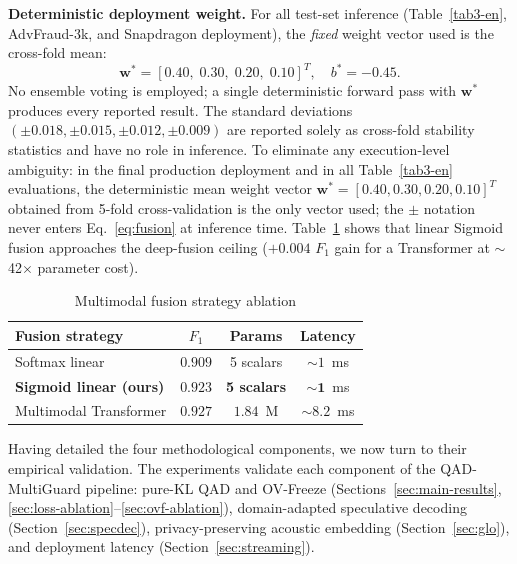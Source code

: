 \documentclass[final,5p,times,number]{elsarticle}
\begin{document}
\noindent\textbf{Deterministic deployment weight.} For all test-set inference (Table~\ref{tab3-en}, AdvFraud-3k, and Snapdragon deployment), the \emph{fixed} weight vector used is the cross-fold mean:
\begin{equation}
\label{eq:w-deploy}
\mathbf{w}^{*} = [0.40,\; 0.30,\; 0.20,\; 0.10]^{T}, \quad b^{*} = -0.45.
\end{equation}
No ensemble voting is employed; a single deterministic forward pass with $\mathbf{w}^{*}$ produces every reported result. The standard deviations $(\pm 0.018, \pm 0.015, \pm 0.012, \pm 0.009)$ are reported solely as cross-fold stability statistics and have no role in inference. To eliminate any execution-level ambiguity: in the final production deployment and in all Table~\ref{tab3-en} evaluations, the deterministic mean weight vector $\mathbf{w}^{*} = [0.40, 0.30, 0.20, 0.10]^{T}$ obtained from 5-fold cross-validation is the only vector used; the $\pm$ notation never enters Eq.~\eqref{eq:fusion} at inference time. Table~\ref{tab:fusion_ablation-en} shows that linear Sigmoid fusion approaches the deep-fusion ceiling ($+0.004$ $F_1$ gain for a Transformer at $\sim$42$\times$ parameter cost).

\begin{table}[!t]
\centering
\caption{Multimodal fusion strategy ablation}
\label{tab:fusion_ablation-en}
\small
\renewcommand{\arraystretch}{1.15}
\begin{tabular}{lccc}
\toprule
\textbf{Fusion strategy} & \textbf{$F_1$} & \textbf{Params} & \textbf{Latency} \\
\midrule
Softmax linear & $0.909$ & 5 scalars & $\sim 1$~ms \\
\textbf{Sigmoid linear (ours)} & $\mathbf{0.923}$ & \textbf{5 scalars} & $\mathbf{\sim 1}$~ms \\
Multimodal Transformer & $0.927$ & $1.84$~M & $\sim 8.2$~ms \\
\bottomrule
\end{tabular}
\end{table}

Having detailed the four methodological components, we now turn to their empirical validation. The experiments validate each component of the QAD-MultiGuard pipeline: pure-KL QAD and OV-Freeze (Sections~\ref{sec:main-results}, \ref{sec:loss-ablation}--\ref{sec:ovf-ablation}), domain-adapted speculative decoding (Section~\ref{sec:specdec}), privacy-preserving acoustic embedding (Section~\ref{sec:glo}), and deployment latency (Section~\ref{sec:streaming}).
\end{document}
